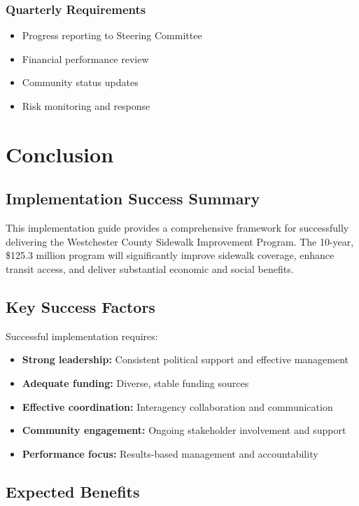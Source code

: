 \documentclass[11pt,letterpaper]{article}
\begin{document}
\subsubsection{Quarterly Requirements}
\begin{itemize}
    \item[$\square$] Progress reporting to Steering Committee
    \item[$\square$] Financial performance review
    \item[$\square$] Community status updates
    \item[$\square$] Risk monitoring and response
\end{itemize}

\section{Conclusion}

\subsection{Implementation Success Summary}

This implementation guide provides a comprehensive framework for successfully delivering the Westchester County Sidewalk Improvement Program. The 10-year, \$125.3 million program will significantly improve sidewalk coverage, enhance transit access, and deliver substantial economic and social benefits.

\subsection{Key Success Factors}

Successful implementation requires:
\begin{itemize}
    \item \textbf{Strong leadership:} Consistent political support and effective management
    \item \textbf{Adequate funding:} Diverse, stable funding sources
    \item \textbf{Effective coordination:} Interagency collaboration and communication
    \item \textbf{Community engagement:} Ongoing stakeholder involvement and support
    \item \textbf{Performance focus:} Results-based management and accountability
\end{itemize}

\subsection{Expected Benefits}
\end{document}
